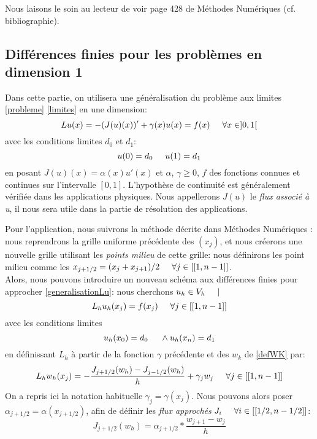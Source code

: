\documentclass[12pt]{article}
\newcommand{\espace}{\hspace{5mm}}
\begin{document}
Nous laisons le soin au lecteur de voir page 428 de Méthodes Numériques (cf. bibliographie).

\subsection{Différences finies pour les problèmes en dimension 1}
Dans cette partie, on utilisera une généralisation du problème aux limites \eqref{probleme} \eqref{limites} en une dimension:
\begin{equation} \label{generalisationLu}
Lu(x) = -(J(u)(x))' + \gamma (x) u(x)  = f(x) \espace \forall x \in ]0,1[
\end{equation}
avec les conditions limites $d_0$ et $d_1$:
\begin{equation}
u(0) = d_0 \espace u(1) = d_1
\end{equation}
en posant $J(u)(x) = \alpha(x) u'(x)$ et $\alpha$, $\gamma \ge 0$, $f$ des fonctions connues et continues sur l'intervalle $[0,1]$. L'hypothèse de continuité est généralement vérifiée dans les applications physiques.  Nous appellerons $J(u)$ le \emph{flux associé à u}, il nous sera utile dans la partie de résolution des applications.

Pour l'application, nous suivrons la méthode décrite dans Méthodes Numériques : nous reprendrons la grille uniforme précédente des $(x_j)$, et nous créerons une nouvelle grille utilisant les \emph{points milieu} de cette grille: nous définirons les point milieu comme les $x_{j+1/2} = (x_j + x_{j+1}) /2 \espace \forall j \in [[1,n-1]]$. \\
Alors, nous pouvons introduire un nouveau schéma aux différences finies pour approcher \eqref{generalisationLu}: nous cherchons $u_h \in V_h \espace |$
\begin{equation} \label{miseEnFormeTemporaire}
L_h u_h (x_j) = f(x_j) \espace \forall j \in [[1,n-1]]
\end{equation}
avec les conditions limites
\begin{equation}
u_h(x_0) = d_0 \espace \wedge u_h(x_n) = d_1
\end{equation}
en définissant $L_h$ à partir de la fonction $\gamma$ précédente et des $w_k$ de \eqref{defWK} par:
\begin{equation} \label{katto}
	L_h w_h (x_j) = - \frac{J_{j + 1/2}(w_h) - J_{j - 1/2}(w_h)}{h} + \gamma_j w_j  \espace \forall j \in [[1,n-1]]
\end{equation}
On a repris ici la notation habituelle $\gamma_j = \gamma(x_j)$. Nous pouvons alors poser $\alpha_{j+1/2} = \alpha(x_{j+1/2})$, afin de définir les \emph{flux approchés} $J_i \espace \forall i \in [[1/2,n-1/2]]$:
\begin{equation}
J_{j+1/2} (w_h) = \alpha_{j+1/2} * \frac{w_{j+1} - w_j}{h}
\end{equation}
\end{document}
